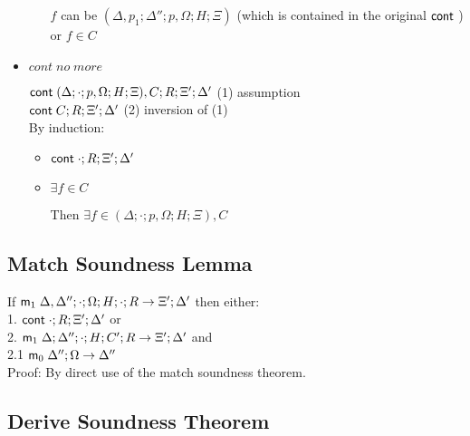\begin{itemize}
\begin{itemize}
      $f$ can be $(\Delta, p_1; \Delta''; p, \Omega; H; \Xi)$ (which is contained in the original $\mathsf{cont} \;$)\\
      or $f \in C$\\
      
   \end{itemize}
   
   \item $cont \; no \; more$
   
   $\mathsf{cont} \; (\Delta; \cdot; p, \Omega; H; \Xi), C; R; \Xi'; \Delta'$ \hfill (1) assumption \\
   $\mathsf{cont} \; C; R; \Xi'; \Delta'$ \hfill (2) inversion of (1) \\
   
   By induction:
   
   \begin{itemize}
      \item $\mathsf{cont} \; \cdot; R; \Xi'; \Delta'$
      
      \item $\exists f \in C$
      
      Then $\exists f \in (\Delta; \cdot; p, \Omega; H; \Xi), C$ \\
   \end{itemize}
   
\end{itemize}

\subsection{Match Soundness Lemma}

If $\mathsf{m}_1 \; \Delta, \Delta''; \cdot; \Omega; H; \cdot; R \rightarrow \Xi'; \Delta'$ then either:\\
1. \hspace{1cm} $\mathsf{cont} \; \cdot; R; \Xi'; \Delta'$ or \\
2. \hspace{1cm} $\mathsf{m}_1 \; \Delta; \Delta''; \cdot; H; C'; R \rightarrow \Xi'; \Delta'$ and\\
2.1 \hspace{2cm} $\mathsf{m}_0 \; \Delta''; \Omega \rightarrow \Delta''$\\

Proof: By direct use of the match soundness theorem.

\subsection{Derive Soundness Theorem}

